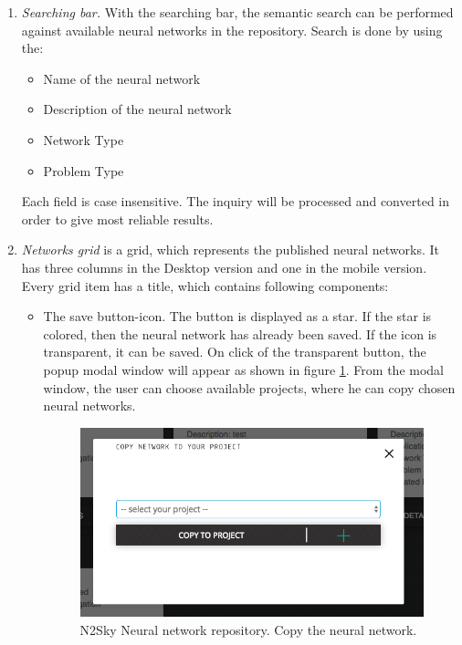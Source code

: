 \begin{enumerate}
\item \emph{Searching bar.} With the searching bar, the semantic search can be performed against available neural networks in the repository. Search is done by using the: 
\begin{itemize}
\item Name of the neural network
\item Description of the neural network
\item Network Type
\item Problem Type
\end{itemize}

Each field is case insensitive. The inquiry will be processed and converted in order to give most reliable results. 

\item \emph{Networks grid} is a grid, which represents the published neural networks. It has three columns in the Desktop version and one in the mobile version. Every grid item has a title, which contains following components:
\begin{itemize}
\item The save button-icon. The button is displayed as a star. If the star is colored, then the neural network has already been saved. If the icon is transparent, it can be saved. On click of the transparent button, the popup modal window will appear as shown in figure \ref{fig:copy_nn}. From the modal window, the user can choose available projects, where he can copy chosen neural networks. 


\begin{figure}[htbp]
\begin{center}
  \includegraphics[scale=0.5]{components/5/img/copy_nn.png}
  \caption{N2Sky Neural network repository. Copy the neural network.}
  \label{fig:copy_nn}
\end{center}
\end{figure}


\end{itemize}
\end{enumerate}
